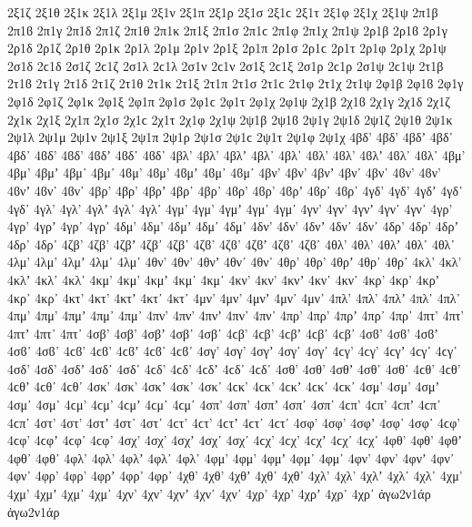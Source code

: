{2ξ1ζ
2ξ1θ
2ξ1κ
2ξ1λ
2ξ1μ
2ξ1ν
2ξ1π
2ξ1ρ
2ξ1σ 2ξ1ϲ
2ξ1τ
2ξ1φ
2ξ1χ
2ξ1ψ
%
2π1β 2π1ϐ
2π1γ
2π1δ
2π1ζ
2π1θ
2π1κ
2π1ξ
2π1σ 2π1ϲ
2π1φ
2π1χ
2π1ψ
%
2ρ1β 2ρ1ϐ
2ρ1γ
2ρ1δ
2ρ1ζ
2ρ1θ
2ρ1κ
2ρ1λ
2ρ1μ
2ρ1ν
2ρ1ξ
2ρ1π
2ρ1σ 2ρ1ϲ
2ρ1τ
2ρ1φ
2ρ1χ
2ρ1ψ
%
2σ1δ 2ϲ1δ   %
2σ1ζ 2ϲ1ζ
2σ1λ 2ϲ1λ
2σ1ν 2ϲ1ν
2σ1ξ 2ϲ1ξ
2σ1ρ 2ϲ1ρ
2σ1ψ 2ϲ1ψ
%
2τ1β 2τ1ϐ
2τ1γ
2τ1δ
2τ1ζ
2τ1θ
2τ1κ
2τ1ξ
2τ1π
2τ1σ 2τ1ϲ
2τ1φ
2τ1χ
2τ1ψ
%
2φ1β 2φ1ϐ
2φ1γ
2φ1δ
2φ1ζ
2φ1κ
2φ1ξ
2φ1π
2φ1σ 2φ1ϲ
2φ1τ
2φ1χ
2φ1ψ
%
2χ1β 2χ1ϐ
2χ1γ
2χ1δ
2χ1ζ
2χ1κ
2χ1ξ
2χ1π
2χ1σ 2χ1ϲ
2χ1τ
2χ1φ
2χ1ψ
%
2ψ1β 2ψ1ϐ
2ψ1γ
2ψ1δ
2ψ1ζ
2ψ1θ
2ψ1κ
2ψ1λ
2ψ1μ
2ψ1ν
2ψ1ξ
2ψ1π
2ψ1ρ
2ψ1σ 2ψ1ϲ
2ψ1τ
2ψ1φ
2ψ1χ
4βδ' 4βδ’ 4βδʼ 4βδ᾽ 4βδ᾿ 4ϐδ' 4ϐδ’ 4ϐδʼ 4ϐδ᾽ 4ϐδ᾿
4βλ' 4βλ’ 4βλʼ 4βλ᾽ 4βλ᾿ 4ϐλ' 4ϐλ’ 4ϐλʼ 4ϐλ᾽ 4ϐλ᾿
4βμ' 4βμ’ 4βμʼ 4βμ᾽ 4βμ᾿ 4ϐμ' 4ϐμ’ 4ϐμʼ 4ϐμ᾽ 4ϐμ᾿
4βν' 4βν’ 4βνʼ 4βν᾽ 4βν᾿ 4ϐν' 4ϐν’ 4ϐνʼ 4ϐν᾽ 4ϐν᾿
4βρ' 4βρ’ 4βρʼ 4βρ᾽ 4βρ᾿ 4ϐρ' 4ϐρ’ 4ϐρʼ 4ϐρ᾽ 4ϐρ᾿
%
4γδ' 4γδ’ 4γδʼ 4γδ᾽ 4γδ᾿
4γλ' 4γλ’ 4γλʼ 4γλ᾽ 4γλ᾿
4γμ' 4γμ’ 4γμʼ 4γμ᾽ 4γμ᾿
4γν' 4γν’ 4γνʼ 4γν᾽ 4γν᾿
4γρ' 4γρ’ 4γρʼ 4γρ᾽ 4γρ᾿
%
4δμ' 4δμ’ 4δμʼ 4δμ᾽ 4δμ᾿
4δν' 4δν’ 4δνʼ 4δν᾽ 4δν᾿
4δρ' 4δρ’ 4δρʼ 4δρ᾽ 4δρ᾿
%
4ζβ' 4ζβ’ 4ζβʼ 4ζβ᾽ 4ζβ᾿ 4ζϐ' 4ζϐ’ 4ζϐʼ 4ζϐ᾽ 4ζϐ᾿
%
4θλ' 4θλ’ 4θλʼ 4θλ᾽ 4θλ᾿
4λμ' 4λμ’ 4λμʼ 4λμ᾽ 4λμ᾿
4θν' 4θν’ 4θνʼ 4θν᾽ 4θν᾿
4θρ' 4θρ’ 4θρʼ 4θρ᾽ 4θρ᾿
%
4κλ' 4κλ’ 4κλʼ 4κλ᾽ 4κλ᾿
4κμ' 4κμ’ 4κμʼ 4κμ᾽ 4κμ᾿
4κν' 4κν’ 4κνʼ 4κν᾽ 4κν᾿
4κρ' 4κρ’ 4κρʼ 4κρ᾽ 4κρ᾿
4κτ' 4κτ’ 4κτʼ 4κτ᾽ 4κτ᾿
%
4μν' 4μν’ 4μνʼ 4μν᾽ 4μν᾿
%
4πλ' 4πλ’ 4πλʼ 4πλ᾽ 4πλ᾿
4πμ' 4πμ’ 4πμʼ 4πμ᾽ 4πμ᾿
4πν' 4πν’ 4πνʼ 4πν᾽ 4πν᾿
4πρ' 4πρ’ 4πρʼ 4πρ᾽ 4πρ᾿
4πτ' 4πτ’ 4πτʼ 4πτ᾽ 4πτ᾿
%
4σβ' 4σβ’ 4σβʼ 4σβ᾽ 4σβ᾿ 4ϲβ' 4ϲβ’ 4ϲβʼ 4ϲβ᾽ 4ϲβ᾿ 4σϐ' 4σϐ’ 4σϐʼ 4σϐ᾽ 4σϐ᾿ 4ϲϐ' 4ϲϐ’ 4ϲϐʼ 4ϲϐ᾽ 4ϲϐ᾿
4σγ' 4σγ’ 4σγʼ 4σγ᾽ 4σγ᾿ 4ϲγ' 4ϲγ’ 4ϲγʼ 4ϲγ᾽ 4ϲγ᾿
4σδ' 4σδ’ 4σδʼ 4σδ᾽ 4σδ᾿ 4ϲδ' 4ϲδ’ 4ϲδʼ 4ϲδ᾽ 4ϲδ᾿
4σθ' 4σθ’ 4σθʼ 4σθ᾽ 4σθ᾿ 4ϲθ' 4ϲθ’ 4ϲθʼ 4ϲθ᾽ 4ϲθ᾿
4σκ' 4σκ’ 4σκʼ 4σκ᾽ 4σκ᾿ 4ϲκ' 4ϲκ’ 4ϲκʼ 4ϲκ᾽ 4ϲκ᾿
4σμ' 4σμ’ 4σμʼ 4σμ᾽ 4σμ᾿ 4ϲμ' 4ϲμ’ 4ϲμʼ 4ϲμ᾽ 4ϲμ᾿
4σπ' 4σπ’ 4σπʼ 4σπ᾽ 4σπ᾿ 4ϲπ' 4ϲπ’ 4ϲπʼ 4ϲπ᾽ 4ϲπ᾿
4στ' 4στ’ 4στʼ 4στ᾽ 4στ᾿ 4ϲτ' 4ϲτ’ 4ϲτʼ 4ϲτ᾽ 4ϲτ᾿
4σφ' 4σφ’ 4σφʼ 4σφ᾽ 4σφ᾿ 4ϲφ' 4ϲφ’ 4ϲφʼ 4ϲφ᾽ 4ϲφ᾿
4σχ' 4σχ’ 4σχʼ 4σχ᾽ 4σχ᾿ 4ϲχ' 4ϲχ’ 4ϲχʼ 4ϲχ᾽ 4ϲχ᾿
%
4φθ' 4φθ’ 4φθʼ 4φθ᾽ 4φθ᾿
4φλ' 4φλ’ 4φλʼ 4φλ᾽ 4φλ᾿
4φμ' 4φμ’ 4φμʼ 4φμ᾽ 4φμ᾿
4φν' 4φν’ 4φνʼ 4φν᾽ 4φν᾿
4φρ' 4φρ’ 4φρʼ 4φρ᾽ 4φρ᾿
%
4χθ' 4χθ’ 4χθʼ 4χθ᾽ 4χθ᾿
4χλ' 4χλ’ 4χλʼ 4χλ᾽ 4χλ᾿
4χμ' 4χμ’ 4χμʼ 4χμ᾽ 4χμ᾿
4χν' 4χν’ 4χνʼ 4χν᾽ 4χν᾿
4χρ' 4χρ’ 4χρʼ 4χρ᾽ 4χρ᾿
%
ἀγω2ν1άρ ἀγω2ν1άρ   %
}

